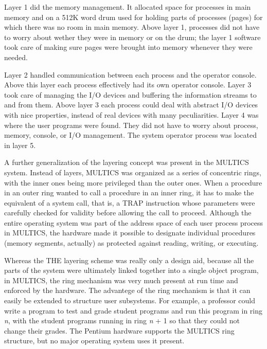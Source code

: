 \documentclass{book}
\newcommand {\sys} [1] {\textsl{#1}}
\begin{document}
Layer 1 did the memory management.
It allocated space for processes in main memory and on a 512K word drum used for holding parts of processes (pages) 
for which there was no room in main memory.
Above layer 1, processes did not have to worry about wether they were in memory or on the drum;
the layer 1 software took care of making sure pages were brought into memory whenever they were needed.

Layer 2 handled communication between each process and the operator console.
Above this layer each process effectively had its own operator console.
Layer 3 took care of managing the I/O devices and buffering the information streams to and from them.
Above layer 3 each process could deal with abstract I/O devices with nice properties, 
instead of real devices with many peculiarities.
Layer 4 was where the user  programs were found.
They did not have to worry about process, memory, console, or I/O management.
The system operator process was located in layer 5.

A further generalization of the layering concept was present in the MULTICS system.
Instead of layers, MULTICS was organized as a series of concentric rings, with the inner ones being more privileged than the outer ones.
When a procedure in an outer ring wanted to call a procedure in an inner ring,
it has to make the equivalent of a system call, that is, a TRAP instruction
whose parameters were carefully checked for validity before allowing the call to proceed.
Although the entire operating system was part of the address space of each user process process in MULTICS,
the hardware made it possible to designate individual procedures (memory segments, actually)
as protected against reading, writing, or executing.

Whereas the THE layering scheme was really only a design aid, 
because all the parts of the system were ultimately linked together into a single object program, in MULTICS,
the ring mechanism was very much present at run time and enforced by the hardware.
The advantege of the ring mechanism is that it can easily be extended to structure user subsystems.
For example, a professor could write a program to test and grade student programs and run this program in ring \sys{n},
with the student programs running in ring \sys{n} + 1 so that they could not change their grades.
The Pentium hardware supports the MULTICS ring structure, but no major operating system uses it present.
\end{document}

